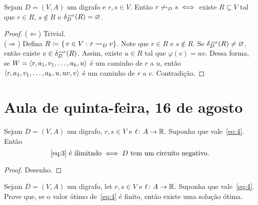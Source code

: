 \documentclass[10pt,reqno]{amsart}
\begin{document}
\begin{theorem}
  Sejam \(D = (V,A)\) um digrafo e \(r,s \in V\).  Então
  \(r \not\reaches_D s \iff\) existe \(R \subseteq V\) tal que
  \(r \in R\), \(s \not\in R\) e \(\deltaout[D](R) = \emptyset\).
\end{theorem}
\begin{proof}
(\(\Leftarrow\)) Trivial.
\\ (\(\Rightarrow\)) Defina \(R \coloneqq \setst{v \in V}{r \reaches_D v}\).
   Note que \(r \in R\) e \(s \notin R\). Se \(\deltaout[D](R) \neq \emptyset\), 
   então existe \(v \in \deltaout[D](R)\). Assim, existe \(u \in R\) tal que
   \(\varphi(v) = uv\). Dessa forma, se \(W = \seq{r,a_1,v_1,\dotsc,a_k,u}\) 
   é um caminho de \(r\) a \(u\), então \(\seq{r,a_1,v_1,\dotsc,a_k,u,uv,v}\)
   é um caminho de \(r\) a \(v\). Contradição.
\end{proof}

\section{Aula de quinta-feira, 16 de agosto}

\begin{proposition}
  \label{prop:2}
  Sejam \(D = (V,A)\) um digrafo, \(r,s \in V\) e
  \(\ell \colon A \to \Reals\).  Suponha que vale~\eqref{eq:4}.
  Então
  \begin{equation}
    \label{eq:6}
    \text{\eqref{eq:3} é ilimitado}
    \iff
    \text{\(D\) tem um circuito negativo}.
  \end{equation}
\end{proposition}
\begin{proof} Desenho.
  
\end{proof}

\begin{exercise}
  \label{ex:4}
  Sejam \(D = (V,A)\) um digrafo, let \(r,s \in V\) e
  \(\ell \colon A \to \Reals\).  Suponha que vale~\eqref{eq:4}.
  Prove que, se o valor ótimo de~\eqref{eq:4} é finito, então
  existe uma solução ótima.
\end{exercise}
\end{document}
